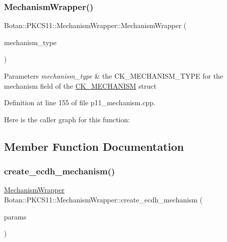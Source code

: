 \subsubsection{\texorpdfstring{Mechanism\+Wrapper()}{MechanismWrapper()}}
{\footnotesize\ttfamily Botan\+::\+P\+K\+C\+S11\+::\+Mechanism\+Wrapper\+::\+Mechanism\+Wrapper (\begin{DoxyParamCaption}\item[{Mechanism\+Type}]{mechanism\+\_\+type }\end{DoxyParamCaption})\hspace{0.3cm}{\ttfamily [explicit]}}


\begin{DoxyParams}{Parameters}
{\em mechanism\+\_\+type} & the C\+K\+\_\+\+M\+E\+C\+H\+A\+N\+I\+S\+M\+\_\+\+T\+Y\+PE for the {\ttfamily mechanism} field of the \mbox{\hyperlink{struct_c_k___m_e_c_h_a_n_i_s_m}{C\+K\+\_\+\+M\+E\+C\+H\+A\+N\+I\+SM}} struct \\
\hline
\end{DoxyParams}


Definition at line 155 of file p11\+\_\+mechanism.\+cpp.

Here is the caller graph for this function\+:


\subsection{Member Function Documentation}
\mbox{\label{class_botan_1_1_p_k_c_s11_1_1_mechanism_wrapper_a1b5254b80bd47178af6ed563df0a9352}} 
\subsubsection{\texorpdfstring{create\+\_\+ecdh\+\_\+mechanism()}{create\_ecdh\_mechanism()}}
{\footnotesize\ttfamily \mbox{\hyperlink{class_botan_1_1_p_k_c_s11_1_1_mechanism_wrapper}{Mechanism\+Wrapper}} Botan\+::\+P\+K\+C\+S11\+::\+Mechanism\+Wrapper\+::create\+\_\+ecdh\+\_\+mechanism (\begin{DoxyParamCaption}\item[{const std\+::string \&}]{params }\end{DoxyParamCaption})\hspace{0.3cm}{\ttfamily [static]}}

